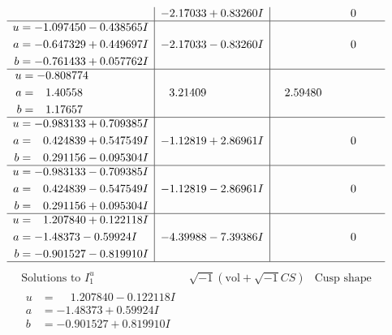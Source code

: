\documentclass[1p]{elsarticle_modified}
\theoremstyle{definition}
\newcommand{\I}{\sqrt{-1}}
\begin{document}
$$\begin{array}{c|c|c}
 & -2.17033 + 0.83260 I & \phantom{-0.000000 } 0 \\ \hline\begin{aligned}
u &= -1.097450 - 0.438565 I \\
a &= -0.647329 + 0.449697 I \\
b &= -0.761433 + 0.057762 I\end{aligned}
 & -2.17033 - 0.83260 I & \phantom{-0.000000 } 0 \\ \hline\begin{aligned}
u &= -0.808774\phantom{ +0.000000I} \\
a &= \phantom{-}1.40558\phantom{ +0.000000I} \\
b &= \phantom{-}1.17657\phantom{ +0.000000I}\end{aligned}
 & \phantom{-}3.21409\phantom{ +0.000000I} & \phantom{-}2.59480\phantom{ +0.000000I} \\ \hline\begin{aligned}
u &= -0.983133 + 0.709385 I \\
a &= \phantom{-}0.424839 + 0.547549 I \\
b &= \phantom{-}0.291156 - 0.095304 I\end{aligned}
 & -1.12819 + 2.86961 I & \phantom{-0.000000 } 0 \\ \hline\begin{aligned}
u &= -0.983133 - 0.709385 I \\
a &= \phantom{-}0.424839 - 0.547549 I \\
b &= \phantom{-}0.291156 + 0.095304 I\end{aligned}
 & -1.12819 - 2.86961 I & \phantom{-0.000000 } 0 \\ \hline\begin{aligned}
u &= \phantom{-}1.207840 + 0.122118 I \\
a &= -1.48373 - 0.59924 I \\
b &= -0.901527 - 0.819910 I\end{aligned}
 & -4.39988 - 7.39386 I & \phantom{-0.000000 } 0\\
 \hline 
 \end{array}$$\newpage$$\begin{array}{c|c|c}  
\text{Solutions to }I^u_{1}& \I (\text{vol} + \sqrt{-1}CS) & \text{Cusp shape}\\
 \hline 
\begin{aligned}
u &= \phantom{-}1.207840 - 0.122118 I \\
a &= -1.48373 + 0.59924 I \\
b &= -0.901527 + 0.819910 I\end{aligned}

\end{array}$$
\end{document}
